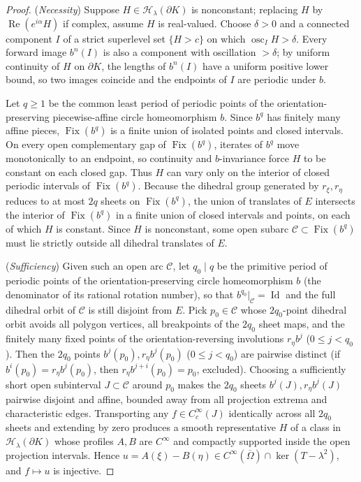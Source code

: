 \documentclass[11pt,reqno]{amsart}
\theoremstyle{definition}
\theoremstyle{remark}
\DeclareMathOperator{\Fix}{Fix}
\DeclareMathOperator{\Id}{Id}
\begin{document}
\begin{proof}
(\emph{Necessity}) Suppose $H \in \mathcal{H}_\lambda(\partial K)$ is nonconstant; replacing $H$ by $\operatorname{Re}(e^{i\alpha} H)$ if complex, assume $H$ is real-valued. Choose $\delta > 0$ and a connected component $I$ of a strict superlevel set $\{H > c\}$ on which $\operatorname{osc}_I H > \delta$. Every forward image $b^n(I)$ is also a component with oscillation $> \delta$; by uniform continuity of $H$ on $\partial K$, the lengths of $b^n(I)$ have a uniform positive lower bound, so two images coincide and the endpoints of $I$ are periodic under $b$.

Let $q \ge 1$ be the common least period of periodic points of the orientation-preserving piecewise-affine circle homeomorphism $b$. Since $b^q$ has finitely many affine pieces, $\Fix(b^q)$ is a finite union of isolated points and closed intervals. On every open complementary gap of $\Fix(b^q)$, iterates of $b^q$ move monotonically to an endpoint, so continuity and $b$-invariance force $H$ to be constant on each closed gap. Thus $H$ can vary only on the interior of closed periodic intervals of $\Fix(b^q)$. Because the dihedral group generated by $r_\xi, r_\eta$ reduces to at most $2q$ sheets on $\Fix(b^q)$, the union of translates of $E$ intersects the interior of $\Fix(b^q)$ in a finite union of closed intervals and points, on each of which $H$ is constant. Since $H$ is nonconstant, some open subarc $\mathcal{C} \subset \Fix(b^q)$ must lie strictly outside all dihedral translates of $E$.

(\emph{Sufficiency}) Given such an open arc $\mathcal{C}$, let $q_0 \mid q$ be the primitive period of periodic points of the orientation-preserving circle homeomorphism $b$ (the denominator of its rational rotation number), so that $b^{q_0}|_{\mathcal{C}} = \Id$ and the full dihedral orbit of $\mathcal{C}$ is still disjoint from $E$. Pick $p_0 \in \mathcal{C}$ whose $2q_0$-point dihedral orbit avoids all polygon vertices, all breakpoints of the $2q_0$ sheet maps, and the finitely many fixed points of the orientation-reversing involutions $r_\eta b^j$ ($0 \le j < q_0$). Then the $2q_0$ points $b^j(p_0), r_\eta b^j(p_0)$ ($0 \le j < q_0$) are pairwise distinct (if $b^i(p_0) = r_\eta b^j(p_0)$, then $r_\eta b^{j+i}(p_0) = p_0$, excluded). Choosing a sufficiently short open subinterval $J \subset \mathcal{C}$ around $p_0$ makes the $2q_0$ sheets $b^j(J), r_\eta b^j(J)$ pairwise disjoint and affine, bounded away from all projection extrema and characteristic edges. Transporting any $f \in C_c^\infty(J)$ identically across all $2q_0$ sheets and extending by zero produces a smooth representative $H$ of a class in $\mathcal{H}_\lambda(\partial K)$ whose profiles $A, B$ are $C^\infty$ and compactly supported inside the open projection intervals. Hence $u = A(\xi) - B(\eta) \in C^\infty(\overline{\Omega}) \cap \ker(T - \lambda^2)$, and $f \mapsto u$ is injective.
\end{proof}
\end{document}
